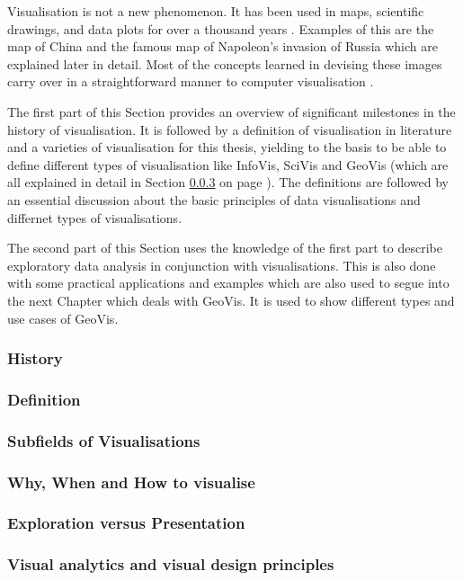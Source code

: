 Visualisation is not a new phenomenon. It has been used in maps, scientific drawings, and data plots for over a thousand years . Examples of this are the map of China and the famous map of Napoleon's invasion of Russia which are explained later in detail. Most of the concepts learned in devising these images carry over in a straightforward manner to computer visualisation .

The first part of this Section provides an overview of significant milestones in the history of visualisation. It is followed by a definition of visualisation in literature and a varieties of visualisation for this thesis, yielding to the basis to be able to define different types of visualisation like \ac{InfoVis}, \ac{SciVis} and \ac{GeoVis} (which are all explained in detail in Section \ref{s:definitions-types} on page \pageref{s:definitions-types}). The definitions are followed by an essential discussion about the basic principles of data visualisations and differnet types of visualisations.

The second part of this Section uses the knowledge of the first part to describe exploratory data analysis in conjunction with visualisations. This is also done with some practical applications and examples which are also used to segue into the next Chapter which deals with \ac{GeoVis}. It is used to show different types and use cases of \ac{GeoVis}.

\subsubsection{History}
\label{s:history}


\subsubsection{Definition}
\label{s:definition}


\subsubsection{Subfields of Visualisations}
\label{s:definitions-types}


\subsubsection{Why, When and How to visualise}
\label{s:basics}


\subsubsection{Exploration versus Presentation}
\label{s:eda}


\subsubsection{Visual analytics and visual design principles}

